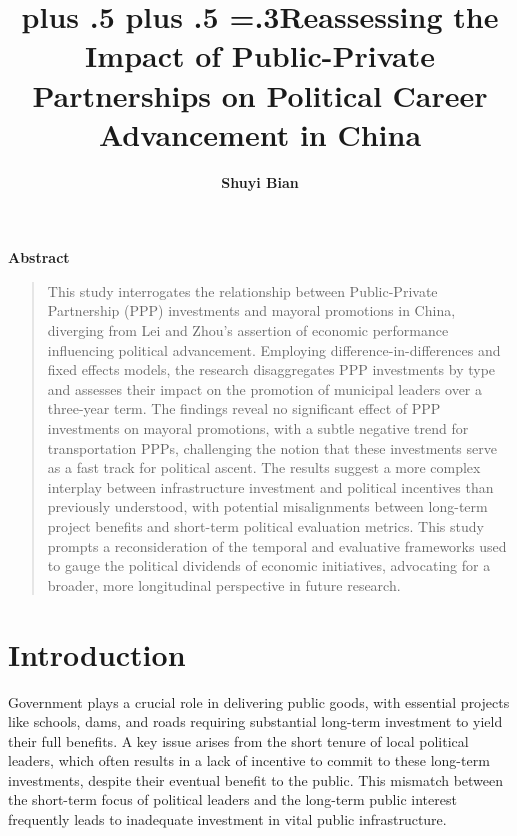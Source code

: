 \documentclass[12pt, ]{article}
\title{\sffamily\bfseries\huge\parfillskip=0pt
\rightskip=0pt plus .5\textwidth
\leftskip=0pt plus .5\textwidth
\emergencystretch=.3\textwidth Reassessing the Impact of Public-Private
Partnerships on Political Career Advancement in China}
\author{\textbf{Shuyi Bian}
 }
\date{}
\renewenvironment{abstract}{
  \centerline
  {\large\sffamily\bfseries Abstract}\vspace{-1em}
  \begin{quote}\small
}{
  \end{quote}
}
\begin{document}
\allsectionsfont{\sffamily}

\maketitle

\begin{abstract}
This study interrogates the relationship between Public-Private
Partnership (PPP) investments and mayoral promotions in China, diverging
from Lei and Zhou's assertion of economic performance influencing
political advancement. Employing difference-in-differences and fixed
effects models, the research disaggregates PPP investments by type and
assesses their impact on the promotion of municipal leaders over a
three-year term. The findings reveal no significant effect of PPP
investments on mayoral promotions, with a subtle negative trend for
transportation PPPs, challenging the notion that these investments serve
as a fast track for political ascent. The results suggest a more complex
interplay between infrastructure investment and political incentives
than previously understood, with potential misalignments between
long-term project benefits and short-term political evaluation metrics.
This study prompts a reconsideration of the temporal and evaluative
frameworks used to gauge the political dividends of economic
initiatives, advocating for a broader, more longitudinal perspective in
future research.
\end{abstract}

\ifdefined\Shaded\renewenvironment{Shaded}{\begin{tcolorbox}[borderline west={3pt}{0pt}{shadecolor}, boxrule=0pt, frame hidden, sharp corners, breakable, enhanced, interior hidden]}{\end{tcolorbox}}\fi




\hypertarget{introduction}{%
\section{Introduction}\label{introduction}}

Government plays a crucial role in delivering public goods, with
essential projects like schools, dams, and roads requiring substantial
long-term investment to yield their full benefits. A key issue arises
from the short tenure of local political leaders, which often results in
a lack of incentive to commit to these long-term investments, despite
their eventual benefit to the public. This mismatch between the
short-term focus of political leaders and the long-term public interest
frequently leads to inadequate investment in vital public
infrastructure.\citep{lei2022private}
\end{document}
